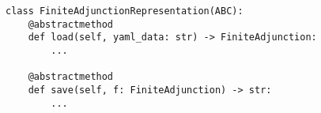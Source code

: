 \par\begin{minipage}{60ex}
\begin{verbatim}
class FiniteAdjunctionRepresentation(ABC):
    @abstractmethod
    def load(self, yaml_data: str) -> FiniteAdjunction:
        ...

    @abstractmethod
    def save(self, f: FiniteAdjunction) -> str:
        ...
\end{verbatim}
\end{minipage}\par